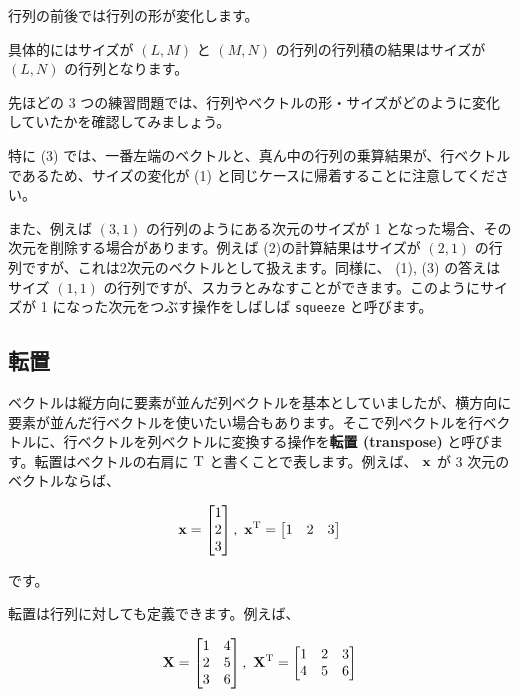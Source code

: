 行列の前後では行列の形が変化します。

具体的にはサイズが $(L, M)$ と $(M, N)$ の行列の行列積の結果はサイズが $(L, N)$ の行列となります。

先ほどの 3 つの練習問題では、行列やベクトルの形・サイズがどのように変化していたかを確認してみましょう。




特に (3) では、一番左端のベクトルと、真ん中の行列の乗算結果が、行ベクトルであるため、サイズの変化が (1) と同じケースに帰着することに注意してください。


また、例えば $(3, 1)$ の行列のようにある次元のサイズが 1 となった場合、その次元を削除する場合があります。例えば (2)の計算結果はサイズが $(2, 1)$ の行列ですが、これは2次元のベクトルとして扱えます。同様に、 (1), (3) の答えはサイズ $(1, 1)$ の行列ですが、スカラとみなすことができます。このようにサイズが 1 になった次元をつぶす操作をしばしば \texttt{squeeze} と呼びます。


\subsection{転置}


ベクトルは縦方向に要素が並んだ列ベクトルを基本としていましたが、横方向に要素が並んだ行ベクトルを使いたい場合もあります。そこで列ベクトルを行ベクトルに、行ベクトルを列ベクトルに変換する操作を\textbf{転置 (transpose)} と呼びます。転置はベクトルの右肩に ${\rm T}$ と書くことで表します。例えば、 ${\bf x}$ が 3 次元のベクトルならば、


\[
{\bf x}
=\begin{bmatrix}
1 \\
2 \\
3
\end{bmatrix}, \
{\bf x}^{\rm T} = \begin{bmatrix} 1 & 2 & 3 \end{bmatrix}
\]


です。

転置は行列に対しても定義できます。例えば、


\[
{\bf X}
=\begin{bmatrix}
1 & 4 \\
2 & 5 \\
3 & 6
\end{bmatrix}, \
{\bf X}^{\rm T}=\begin{bmatrix}
1 & 2 & 3 \\
4 & 5 & 6
\end{bmatrix}
\]


